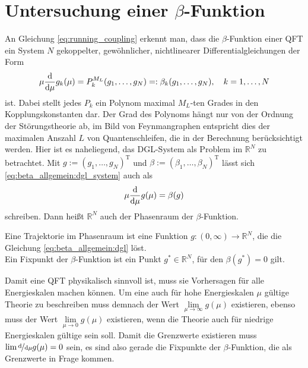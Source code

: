 \clearpage
\section{Untersuchung einer $\beta$-Funktion}


  An Gleichung \ref{eq:running_coupling} erkennt man, dass die $\beta$-Funktion einer 
  QFT ein System $N$ gekoppelter, gewöhnlicher, nichtlinearer 
  Differentialgleichungen der Form 
  \begin{equation}
   \mu \frac{\text{d}}{\text{d} \mu} g_k (\mu)  = P_k^{M_L}(g_1,\ldots, g_N)=:\beta_k(g_1,\ldots,g_N) 
   , \quad k=1,\ldots,N \label{eq:beta_allgemein:dgl_system}
  \end{equation}
  ist. Dabei stellt jedes $P_k$ ein Polynom maximal $M_L$-ten Grades in den Kopplungskonstanten 
  dar. Der Grad des Polynoms hängt nur von der Ordnung der Störungstheorie ab, im Bild von 
  Feynmangraphen entspricht dies der maximalen Anszahl $L$ von Quantenschleifen, die in 
  der Berechnung berücksichtigt werden. Hier ist es naheliegend, das DGL-System als Problem 
  im $\mathbb{R}^N$ zu betrachtet. Mit $g:=(g_1,\ldots,g_N)^\text{T}$ und 
  $\beta:=(\beta_1,\ldots,\beta_N)^\text{T}$ lässt sich \eqref{eq:beta_allgemein:dgl_system} 
  auch als
  \begin{equation}
   \mu \frac{\text{d}}{\text{d} \mu} g(\mu)=\beta(g) \label{eq:beta_allgemein:dgl}
  \end{equation}
  schreiben. Dann heißt $\mathbb{R}^N$ auch der Phasenraum der $\beta$-Funktion.
  \begin{definition}
  Eine Trajektorie im Phasenraum ist eine Funktion $g:(0,\infty)\rightarrow \mathbb{R}^N$, 
  die die Gleichung \eqref{eq:beta_allgemein:dgl} löst.\\
  Ein Fixpunkt der $\beta$-Funktion ist ein Punkt $g^*\in \mathbb{R}^N$, für den
   $\beta(g^*)=0$ gilt.
  \end{definition}
  Damit eine QFT physikalisch sinnvoll ist, muss sie Vorhersagen für alle Energieskalen machen 
  können. Um eine auch für hohe Energieskalen $\mu$ gültige Theorie zu beschreiben muss demnach 
  der Wert $\lim\limits_{\mu\to\infty} g(\mu)$ existieren, ebenso muss der Wert $\lim\limits_{
  \mu\to 0}g(\mu)$ existieren, wenn die Theorie auch für niedrige Energieskalen gültige sein soll. 
  Damit die Grenzwerte existieren muss $\lim\nicefrac{\text{d} }{\text{d} \mu} g(\mu)
  =0$ sein, es sind also gerade die Fixpunkte der $\beta$-Funktion, die als Grenzwerte 
  in Frage kommen.
  
